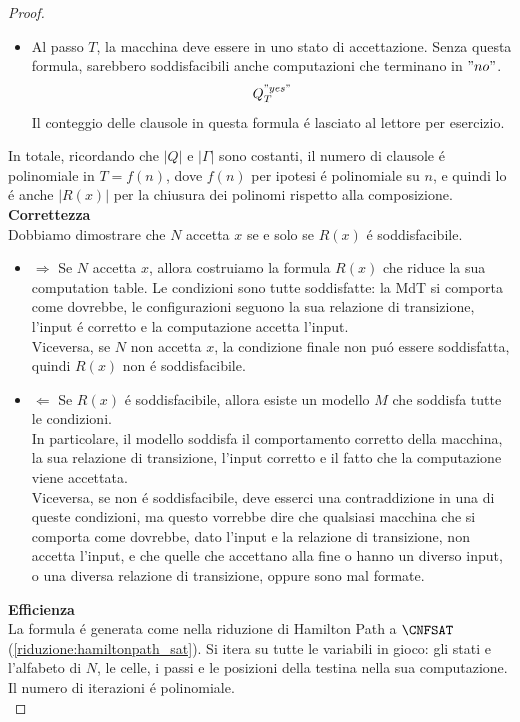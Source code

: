 \begin{proof}
\begin{itemize}
    \item Al passo $T$, la macchina deve essere in uno stato di accettazione. 
    Senza questa formula, sarebbero soddisfacibili anche computazioni che terminano in $"no"$.\\
    \[
    Q_T^{"yes"}
    \]
    Il conteggio delle clausole in questa formula é lasciato al lettore per esercizio.\\
\end{itemize}

In totale, ricordando che $|Q|$ e $|\Gamma|$ sono costanti,
il numero di clausole é polinomiale in $T=f(n)$, 
dove $f(n)$ per ipotesi é polinomiale su $n$, 
e quindi lo é anche $|R(x)|$ 
per la chiusura dei polinomi rispetto alla composizione.\\

\textbf{Correttezza}\\
Dobbiamo dimostrare che $N$ accetta $x$ se e solo se $R(x)$ é soddisfacibile.\\
\begin{itemize}
    \item $\Rightarrow$ Se $N$ accetta $x$, allora costruiamo la formula $R(x)$ che riduce la sua computation table.
    Le condizioni sono tutte soddisfatte: la MdT si comporta come dovrebbe, 
    le configurazioni seguono la sua relazione di transizione, l'input é corretto
    e la computazione accetta l'input.\\
    Viceversa, se $N$ non accetta $x$, la condizione finale non puó essere soddisfatta, quindi $R(x)$ non é soddisfacibile.\\
    \item $\Leftarrow$ Se $R(x)$ é soddisfacibile, allora esiste un modello $M$ che soddisfa tutte le condizioni.\\
    In particolare, il modello soddisfa il comportamento corretto della macchina,
    la sua relazione di transizione, l'input corretto e il fatto che la computazione viene accettata.\\
    Viceversa, se non é soddisfacibile, deve esserci una contraddizione in una di queste condizioni,
    ma questo vorrebbe dire che qualsiasi macchina che si comporta come dovrebbe, dato l'input e la relazione di transizione,
    non accetta l'input, e che quelle che accettano alla fine o hanno un diverso input, o una diversa relazione di transizione,
    oppure sono mal formate.\\
\end{itemize}

\textbf{Efficienza}\\
La formula é generata come nella riduzione di Hamilton Path a $\CNFSAT$ (\ref{riduzione:hamiltonpath_sat}).
Si itera su tutte le variabili in gioco: gli stati e l'alfabeto di $N$, 
le celle, i passi e le posizioni della testina nella sua computazione.\\
Il numero di iterazioni é polinomiale.\\


\end{proof}
